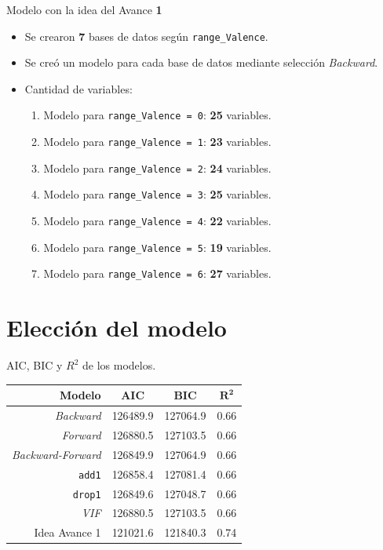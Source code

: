 \documentclass[11pt]{beamer}
\newcommand{\cod}[1]{\texttt{\frenchspacing#1}}
\begin{document}
\begin{frame}{Modelo con la idea del Avance \textbf{1}}
	\begin{itemize}
		\item Se crearon \textbf{7} bases de datos según \cod{range\_Valence}.
		\pause
		\item Se creó un modelo para cada base de datos mediante selección \textit{Backward}.
		\pause
		\item Cantidad de variables:
		\begin{enumerate}
			\item Modelo para \cod{range\_Valence = 0}: \textbf{25} variables.
			\item Modelo para \cod{range\_Valence = 1}: \textbf{23} variables.
			\item Modelo para \cod{range\_Valence = 2}: \textbf{24} variables.
			\item Modelo para \cod{range\_Valence = 3}: \textbf{25} variables.
			\item Modelo para \cod{range\_Valence = 4}: \textbf{22} variables.
			\item Modelo para \cod{range\_Valence = 5}: \textbf{19} variables.
			\item Modelo para \cod{range\_Valence = 6}: \textbf{27} variables.
		\end{enumerate}
	\end{itemize}
\end{frame}

\section{Elección del modelo}

\begin{frame}{AIC, BIC y $R^2$ de los modelos.}
		\begin{center}
			\begin{tabular}{| r | c | c | c |}
				\hline
				\textbf{Modelo} & \textbf{AIC} & \textbf{BIC} & $\mathbf{R^2}$
				\\ \hline
				\textit{Backward} & 126489.9 &  127064.9 & 0.66 \\
				\textit{Forward} & 126880.5 & 127103.5 & 0.66 \\
				\textit{Backward-Forward} & 126849.9 & 127064.9 & 0.66\\
				\cod{add1} & 126858.4 &  127081.4& 0.66\\
				\cod{drop1} & 126849.6 & 127048.7 & 0.66\\
				\textit{VIF} & 126880.5 & 127103.5 & 0.66 \\
				Idea Avance 1 & 121021.6 & 121840.3 & 0.74
				\\ \hline
			\end{tabular}
		\end{center}
\end{frame}
\end{document}
